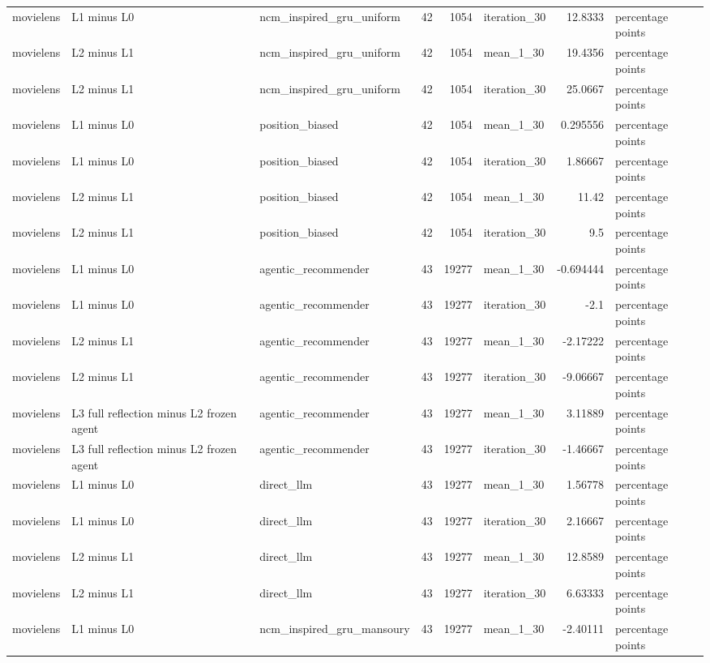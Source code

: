\begin{table}[htbp!]
\begin{tabular}{lllrrlrl}
movielens & L1 minus L0 & ncm\_inspired\_gru\_uniform & 42 & 1054 & iteration\_30 & 12.8333 & percentage points \\
movielens & L2 minus L1 & ncm\_inspired\_gru\_uniform & 42 & 1054 & mean\_1\_30 & 19.4356 & percentage points \\
movielens & L2 minus L1 & ncm\_inspired\_gru\_uniform & 42 & 1054 & iteration\_30 & 25.0667 & percentage points \\
movielens & L1 minus L0 & position\_biased & 42 & 1054 & mean\_1\_30 & 0.295556 & percentage points \\
movielens & L1 minus L0 & position\_biased & 42 & 1054 & iteration\_30 & 1.86667 & percentage points \\
movielens & L2 minus L1 & position\_biased & 42 & 1054 & mean\_1\_30 & 11.42 & percentage points \\
movielens & L2 minus L1 & position\_biased & 42 & 1054 & iteration\_30 & 9.5 & percentage points \\
movielens & L1 minus L0 & agentic\_recommender & 43 & 19277 & mean\_1\_30 & -0.694444 & percentage points \\
movielens & L1 minus L0 & agentic\_recommender & 43 & 19277 & iteration\_30 & -2.1 & percentage points \\
movielens & L2 minus L1 & agentic\_recommender & 43 & 19277 & mean\_1\_30 & -2.17222 & percentage points \\
movielens & L2 minus L1 & agentic\_recommender & 43 & 19277 & iteration\_30 & -9.06667 & percentage points \\
movielens & L3 full reflection minus L2 frozen agent & agentic\_recommender & 43 & 19277 & mean\_1\_30 & 3.11889 & percentage points \\
movielens & L3 full reflection minus L2 frozen agent & agentic\_recommender & 43 & 19277 & iteration\_30 & -1.46667 & percentage points \\
movielens & L1 minus L0 & direct\_llm & 43 & 19277 & mean\_1\_30 & 1.56778 & percentage points \\
movielens & L1 minus L0 & direct\_llm & 43 & 19277 & iteration\_30 & 2.16667 & percentage points \\
movielens & L2 minus L1 & direct\_llm & 43 & 19277 & mean\_1\_30 & 12.8589 & percentage points \\
movielens & L2 minus L1 & direct\_llm & 43 & 19277 & iteration\_30 & 6.63333 & percentage points \\
movielens & L1 minus L0 & ncm\_inspired\_gru\_mansoury & 43 & 19277 & mean\_1\_30 & -2.40111 & percentage points \\

\end{tabular}
\end{table}
